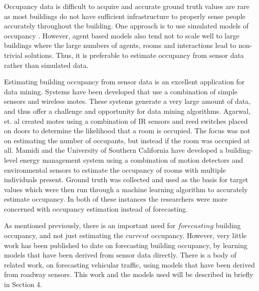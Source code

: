 \documentclass{acm_proc_article-sp}
\begin{document}
Occupancy data is difficult to acquire and accurate ground truth values are rare as most buildings do not have sufficient infrastructure to properly sense people accurately throughout the building.  One approach is to use simulated models of occupancy \cite{PAGE2008, GOLDSTEIN2010}.  However, agent based models also tend not to scale well to large buildings where the large numbers of agents, rooms and interactions lead to non-trivial solutions.  Thus, it is preferable to estimate occupancy from sensor data rather than simulated data.

Estimating building occupancy from sensor data is an excellent application for data mining.  Systems have been developed that use a combination of simple sensors and wireless motes.  These systems generate a very large amount of data, and thus offer a challenge and opportunity for data mining algorithms.  Agarwal, et. al \cite{Agarwal2010} created motes using a combination of IR sensors and reed switches placed on doors to determine the likelihood that a room is occupied.  The focus was not on estimating the number of occupants, but instead if the room was occupied at all.  Mamidi \cite{Mamidi2012} and the University of Southern California have developed a building-level energy management system using a combination of motion detectors and environmental sensors to estimate the occupancy of rooms with multiple individuals present.  Ground truth was collected and used as the basis for target values which were then run through a machine learning algorithm to accurately estimate occupancy.  In both of these instances the researchers were more concerned with occupancy estimation instead of forecasting.

As mentioned previously, there is an important need for $forecasting$ building occupancy, and not just estimating the $current$ occupancy.  However, very little work has been published to date on forecasting building occupancy, by learning models that have been derived from sensor data directly.  There is a body of related work, on forecasting vehicular traffic, using models that have been derived from roadway sensors.  This work and the models used will be described in briefly in Section 4.
\end{document}
